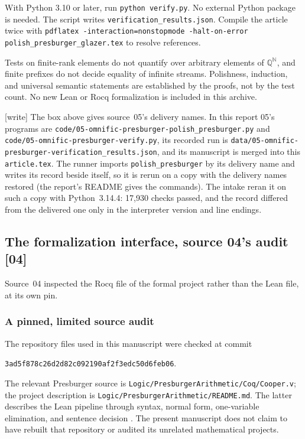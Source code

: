 \documentclass[11pt]{article}
\numberwithin{equation}{section}
\theoremstyle{definition}
\theoremstyle{remark}
\newcommand{\N}{\mathbb N}
\newcommand{\Q}{\mathbb Q}
\newcommand{\code}[1]{\texttt{\small #1}}
\newcommand{\src}[1]{\textup{\textsf{\small[#1]}}}
\newcommand{\writetag}{\textup{\textsf{\small[write]}}}
\newcommand{\fn}[1]{\nolinkurl{#1}}
\begin{document}
\begin{tcolorbox}[title=Reproduction]
\raggedright
With Python 3.10 or later, run \texttt{python verify.py}. No external
Python package is needed. The script writes
\texttt{verification\_results.json}. Compile the article twice with
\texttt{pdflatex -interaction=nonstopmode -halt-on-error
polish\_presburger\_glazer.tex} to resolve references.
\end{tcolorbox}

Tests on finite-rank elements do not quantify over arbitrary elements of
$\Q^{\N}$, and finite prefixes do not decide equality of infinite
streams. Polishness, induction, and universal semantic statements are
established by the proofs, not by the test count. No new Lean or Rocq
formalization is included in this archive.

\noindent\writetag{} The box above gives source~05's delivery names. In this
report 05's programs are \fn{code/05-omnific-presburger-polish_presburger.py}
and \fn{code/05-omnific-presburger-verify.py}, its recorded run is
\fn{data/05-omnific-presburger-verification_results.json}, and its manuscript
is merged into this \fn{article.tex}. The runner imports
\fn{polish_presburger} by its delivery name and writes its record beside
itself, so it is rerun on a copy with the delivery names restored (the
report's README gives the commands). The intake reran it on such a copy with
Python~3.14.4: 17{,}930 checks passed, and the record differed from the
delivered one only in the interpreter version and line endings.

\subsection{The formalization interface, source 04's audit \src{04}}\label{pma:pr:s04:sec:formalization}

Source~04 inspected the Rocq file of the formal project rather than the Lean
file, at its own pin.

\subsubsection{A pinned, limited source audit}

The repository files used in this manuscript were checked at commit
\begin{center}
\code{3ad5f878c26d2d82c092190af2f3edc50d6feb06}.
\end{center}
The relevant Presburger source is
\code{Logic/PresburgerArithmetic/Coq/Cooper.v}; the project description is
\code{Logic/PresburgerArithmetic/README.md}. The latter describes the Lean
pipeline through syntax, normal form, one-variable elimination, and
sentence decision \cite{proveit-presburger}. The present manuscript does
not claim to have rebuilt that repository or audited its unrelated
mathematical projects.
\end{document}
